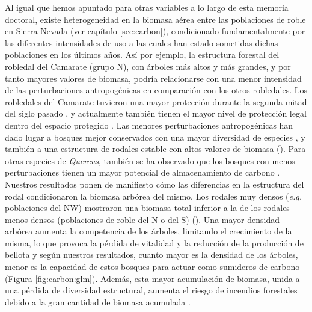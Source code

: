 Al igual que hemos apuntado para otras variables a lo largo de esta memoria doctoral, existe heterogeneidad en la biomasa aérea entre las poblaciones de roble en Sierra Nevada (ver capítulo \ref{sec:carbon}), condicionado fundamentalmente por las diferentes intensidades de uso a las cuales han estado sometidas dichas poblaciones en los últimos años. Así por ejemplo, la estructura forestal del robledal del Camarate (grupo N), con árboles más altos y más grandes, y por tanto mayores valores de biomasa,  podría relacionarse con una menor intensidad de las perturbaciones antropogénicas en comparación con los otros robledales. Los robledales del Camarate tuvieron una mayor protección durante la segunda mitad del siglo pasado \autocite{JimenezOlivencia1991PaisajesSierra}, y actualmente también tienen el mayor nivel de protección legal dentro del espacio protegido \autocite{Anonymous2011Decreto238}. Las menores perturbaciones antropogénicas han dado lugar a bosques mejor conservados con una mayor diversidad de especies \autocite{PerezLuqueetal2021EcologicalDiversity}, y también a una estructura de rodales estable con altos valores de biomasa (). Para otras especies de \emph{Quercus}, también se ha observado que los bosques con menos perturbaciones tienen un mayor potencial de almacenamiento de carbono \autocite{BalboaMuriasetal2006CarbonNutrient,Cotillasetal2016AbovegroundBelowground,Stojanovicetal2017ForecastingTree}. Nuestros resultados ponen de manifiesto cómo las diferencias en la estructura del rodal condicionaron la biomasa arbórea del mismo. Los rodales muy densos (\emph{e.g.} poblaciones del NW) mostraron una biomasa total inferior a la de los rodales menos densos (poblaciones de roble del N o del S) (). Una mayor densidad arbórea aumenta la competencia de los árboles, limitando el crecimiento de la misma, lo que provoca la pérdida de vitalidad y la reducción de la producción de bellota \autocite{Bravoetal2008SelviculturaMontes,Piqueetal2018Spain} y según nuestros resultados, cuanto mayor es la densidad de los árboles, menor es la capacidad de estos bosques para actuar como sumideros de carbono (Figura \ref{fig:carbon:glm}). Además, esta mayor acumulación de biomasa, unida a una pérdida de diversidad estructural, aumenta el riesgo de incendios forestales debido a la gran cantidad de biomasa acumulada \autocite{Canellasetal2004GrowthResponse,PiqueVericat2015EvolutionPerspectives,Serradaetal1992CoppiceSystem}.

